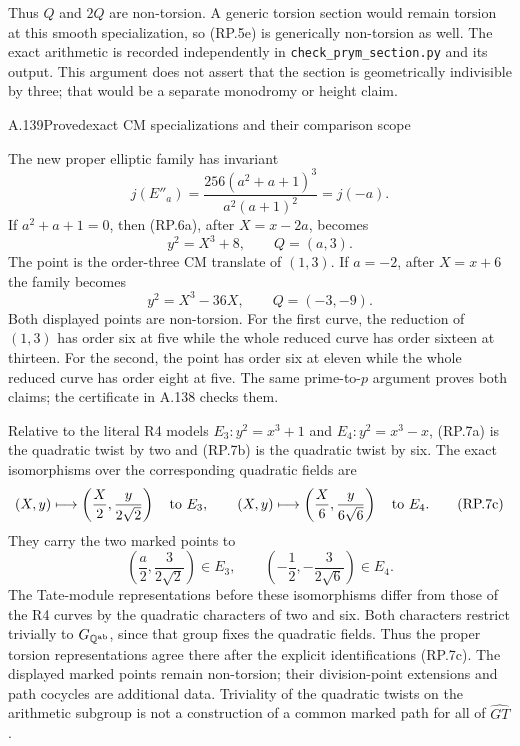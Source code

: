 Thus $Q$ and $2Q$ are non-torsion. A generic
torsion section would remain torsion at this
smooth specialization, so (RP.5e) is generically
non-torsion as well. The exact arithmetic is
recorded independently in
\texttt{check\_prym\_section.py} and its output.
This argument does not assert that the section
is geometrically indivisible by three; that
would be a separate monodromy or height claim.

\begin{statement}{A.139}{Proved}{exact CM specializations and their comparison scope}
\end{statement}
The new proper elliptic family has invariant
\[
             j(E''_a)=
       \frac{256(a^2+a+1)^3}{a^2(a+1)^2}=j(-a).
\]
If $a^2+a+1=0$, then (RP.6a), after $X=x-2a$,
becomes
\[
                 y^2=X^3+8,\qquad Q=(a,3).
 \tag{RP.7a}
\]
The point is the order-three CM translate of
$(1,3)$. If $a=-2$, after $X=x+6$ the family becomes
\[
                 y^2=X^3-36X,\qquad Q=(-3,-9).
 \tag{RP.7b}
\]
Both displayed points are non-torsion. For the
first curve, the reduction of $(1,3)$ has order
six at five while the whole reduced curve has
order sixteen at thirteen. For the second,
the point has order six at eleven while the
whole reduced curve has order eight at five.
The same prime-to-$p$ argument proves both
claims; the certificate in A.138 checks them.

Relative to the literal R4 models
$E_3:y^2=x^3+1$ and $E_4:y^2=x^3-x$,
(RP.7a) is the quadratic twist by two and
(RP.7b) is the quadratic twist by six.
The exact isomorphisms over the corresponding
quadratic fields are
\[
 (X,y)\longmapsto\left(\frac X2,
                            \frac y{2\sqrt2}\right)
          \quad\hbox{to }E_3,
 \qquad
 (X,y)\longmapsto\left(\frac X6,
                            \frac y{6\sqrt6}\right)
          \quad\hbox{to }E_4.
 \tag{RP.7c}
\]
They carry the two marked points to
\[
 \left(\frac a2,\frac3{2\sqrt2}\right)\in E_3,
 \qquad
 \left(-\frac12,-\frac3{2\sqrt6}\right)\in E_4.
\]
The Tate-module representations before these
isomorphisms differ from those of the R4
curves by the quadratic characters of two
and six. Both characters restrict trivially
to $G_{\mathbb Q^{\rm ab}}$, since that group
fixes the quadratic fields. Thus the proper
torsion representations agree there after
the explicit identifications (RP.7c).
The displayed marked points remain
non-torsion; their division-point extensions
and path cocycles are additional data.
Triviality of the quadratic twists on the
arithmetic subgroup is not a construction
of a common marked path for all of
$\widehat{GT}$.

